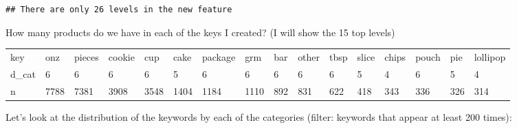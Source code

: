 \documentclass[
]{article}
\newenvironment{Shaded}{\begin{snugshade}}{\end{snugshade}}
\newcommand{\CommentTok}[1]{\textcolor[rgb]{0.56,0.35,0.01}{\textit{#1}}}
\newcommand{\DataTypeTok}[1]{\textcolor[rgb]{0.13,0.29,0.53}{#1}}
\newcommand{\DecValTok}[1]{\textcolor[rgb]{0.00,0.00,0.81}{#1}}
\newcommand{\KeywordTok}[1]{\textcolor[rgb]{0.13,0.29,0.53}{\textbf{#1}}}
\newcommand{\NormalTok}[1]{#1}
\newcommand{\OperatorTok}[1]{\textcolor[rgb]{0.81,0.36,0.00}{\textbf{#1}}}
\newcommand{\StringTok}[1]{\textcolor[rgb]{0.31,0.60,0.02}{#1}}
\begin{document}
\begin{verbatim}
## There are only 26 levels in the new feature
\end{verbatim}

How many products do we have in each of the keys I created? (I will show
the 15 top levels)

\begin{Shaded}
\end{Shaded}

\begin{table}[H]
\centering\begingroup\fontsize{8}{10}\selectfont

\begin{tabular}{llllllllllllllll}
\toprule
\rowcolor{gray!6}  key & onz & pieces & cookie & cup & cake & package & grm & bar & other & tbsp & slice & chips & pouch & pie & lollipop\\
d\_cat & 6 & 6 & 6 & 6 & 5 & 6 & 6 & 6 & 6 & 6 & 5 & 4 & 6 & 5 & 4\\
\rowcolor{gray!6}  n & 7788 & 7381 & 3908 & 3548 & 1404 & 1184 & 1110 & 892 & 831 & 622 & 418 & 343 & 336 & 326 & 314\\
\bottomrule
\end{tabular}
\endgroup{}
\end{table}

Let's look at the distribution of the keywords by each of the categories
(filter: keywords that appear at least 200 times):
\end{document}
